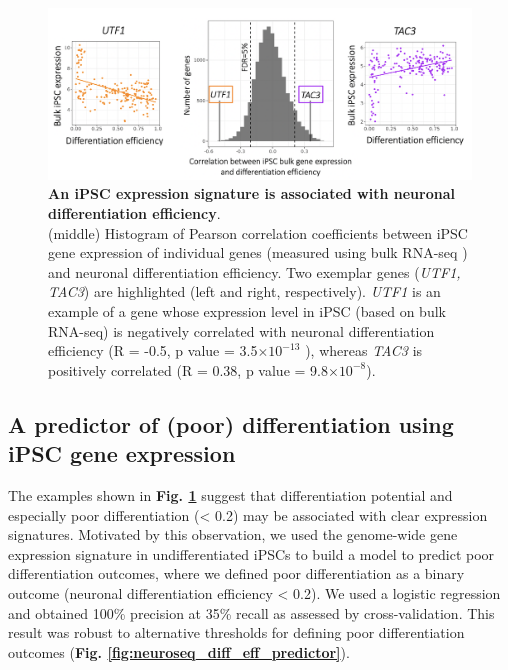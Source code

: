 \begin{figure}[h]
\centering
\includegraphics[width=16cm]{Chapter5/Fig/neuroseq_ips_bulk_expr_correlations.png}
\caption[iPS expression signature of neuronal differentiation efficiency]{\textbf{An iPSC expression signature is associated with neuronal differentiation efficiency}.\\
(middle) Histogram of Pearson correlation coefficients between iPSC gene expression of individual genes (measured using bulk RNA-seq \cite{bonder2019systematic}) and neuronal differentiation efficiency. 
Two exemplar genes (\textit{UTF1, TAC3}) are highlighted (left and right, respectively). 
\textit{UTF1} is an example of a gene whose expression level in iPSC (based on bulk RNA-seq) is negatively correlated with neuronal differentiation efficiency (R = -0.5, p value = 3.5$ \times 10^{-13}$ ), whereas \textit{TAC3} is positively correlated (R = 0.38, p value = 9.8$ \times 10^{-8}$).}
\label{fig:neuroseq_ips_expression_signature}
\end{figure}

\newpage

\subsection{A predictor of (poor) differentiation using iPSC gene expression}
\label{sec:neuro_diff_eff_predictor}

The examples shown in \textbf{Fig. \ref{fig:neuroseq_ips_expression_signature}} suggest that differentiation potential and especially poor differentiation (< 0.2) may be associated with clear expression signatures.
Motivated by this observation, we used the genome-wide gene expression signature in undifferentiated iPSCs to build a model to predict poor differentiation outcomes, where we defined poor differentiation as a binary outcome (neuronal differentiation efficiency < 0.2).
We used a logistic regression and obtained 100\% precision at 35\% recall as assessed by cross-validation. 
This result was robust to alternative thresholds for defining poor differentiation outcomes (\textbf{Fig. \ref{fig:neuroseq_diff_eff_predictor}}). 

